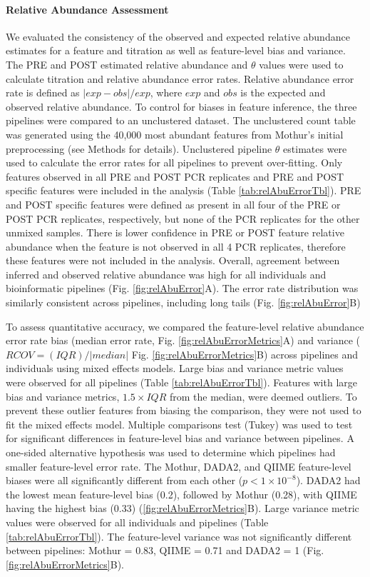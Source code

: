 \documentclass[linenumbers]{bmcart}
\begin{document}
\paragraph{Relative Abundance Assessment}
We evaluated the consistency of
the observed and expected relative abundance estimates for a feature and
titration as well as feature-level bias and variance. The PRE and POST
estimated relative abundance and \(\theta\) values were used to
calculate titration and relative abundance error rates. Relative
abundance error rate is defined as \(|exp - obs|/exp\), where \(exp\)
and \(obs\) is the expected and observed relative abundance. To control
for biases in feature inference, the three pipelines were compared to an
unclustered dataset. The unclustered count table was generated using the
40,000 most abundant features from Mothur's initial preprocessing (see
Methods for details). Unclustered pipeline \(\theta\) estimates were
used to calculate the error rates for all pipelines to prevent
over-fitting. Only features observed in all PRE and POST PCR replicates
and PRE and POST specific features were included in the analysis (Table
\ref{tab:relAbuErrorTbl}). PRE and POST specific features were defined
as present in all four of the PRE or POST PCR replicates, respectively,
but none of the PCR replicates for the other unmixed samples. There is
lower confidence in PRE or POST feature relative abundance when the
feature is not observed in all 4 PCR replicates, therefore these features
were not included in the analysis. Overall, agreement between inferred
and observed relative abundance was high for all individuals and
bioinformatic pipelines (Fig. \ref{fig:relAbuError}A). The error rate
distribution was similarly consistent across pipelines, including long
tails (Fig. \ref{fig:relAbuError}B)

To assess quantitative accuracy, we compared the feature-level relative
abundance error rate bias (median error rate, Fig.
\ref{fig:relAbuErrorMetrics}A) and variance (\(RCOV=(IQR)/|median|\)
Fig. \ref{fig:relAbuErrorMetrics}B) across pipelines and individuals
using mixed effects models. Large bias and variance metric values were
observed for all pipelines (Table \ref{tab:relAbuErrorTbl}). Features
with large bias and variance metrics, \(1.5\times IQR\) from the median,
were deemed outliers. To prevent these outlier features from biasing the
comparison, they were not used to fit the mixed effects model. Multiple
comparisons test (Tukey) was used to test for significant differences in
feature-level bias and variance between pipelines. A one-sided
alternative hypothesis was used to determine which pipelines had smaller
feature-level error rate. The Mothur, DADA2, and QIIME feature-level
biases were all significantly different from each other
(\(p < 1\times 10^{-8}\)). DADA2 had the lowest mean feature-level bias
(0.2), followed by Mothur (0.28), with QIIME having the highest bias
(0.33) (\ref{fig:relAbuErrorMetrics}B). Large variance metric values
were observed for all individuals and pipelines (Table
\ref{tab:relAbuErrorTbl}). The feature-level variance was not
significantly different between pipelines: Mothur = 0.83, QIIME = 0.71
and DADA2 = 1 (Fig. \ref{fig:relAbuErrorMetrics}B).
\end{document}
